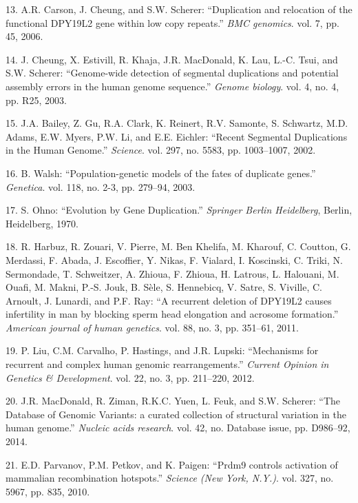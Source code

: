 \documentclass[12pt,twoside]{reedthesis}
\begin{document}
  \hypertarget{ref-Carson2006}{}
  13. A.R. Carson, J. Cheung, and S.W. Scherer: ``Duplication and
  relocation of the functional DPY19L2 gene within low copy repeats.''
  \emph{BMC genomics}. vol. 7, pp. 45, 2006.
  
  \hypertarget{ref-Cheung2003}{}
  14. J. Cheung, X. Estivill, R. Khaja, J.R. MacDonald, K. Lau, L.-C.
  Tsui, and S.W. Scherer: ``Genome-wide detection of segmental
  duplications and potential assembly errors in the human genome
  sequence.'' \emph{Genome biology}. vol. 4, no. 4, pp. R25, 2003.
  
  \hypertarget{ref-Bailey2002}{}
  15. J.A. Bailey, Z. Gu, R.A. Clark, K. Reinert, R.V. Samonte, S.
  Schwartz, M.D. Adams, E.W. Myers, P.W. Li, and E.E. Eichler: ``Recent
  Segmental Duplications in the Human Genome.'' \emph{Science}. vol. 297,
  no. 5583, pp. 1003--1007, 2002.
  
  \hypertarget{ref-Walsh2003}{}
  16. B. Walsh: ``Population-genetic models of the fates of duplicate
  genes.'' \emph{Genetica}. vol. 118, no. 2-3, pp. 279--94, 2003.
  
  \hypertarget{ref-Ohno1970}{}
  17. S. Ohno: ``Evolution by Gene Duplication.'' \emph{Springer Berlin
  Heidelberg}, Berlin, Heidelberg, 1970.
  
  \hypertarget{ref-Harbuz2011a}{}
  18. R. Harbuz, R. Zouari, V. Pierre, M. Ben Khelifa, M. Kharouf, C.
  Coutton, G. Merdassi, F. Abada, J. Escoffier, Y. Nikas, F. Vialard, I.
  Koscinski, C. Triki, N. Sermondade, T. Schweitzer, A. Zhioua, F. Zhioua,
  H. Latrous, L. Halouani, M. Ouafi, M. Makni, P.-S. Jouk, B. Sèle, S.
  Hennebicq, V. Satre, S. Viville, C. Arnoult, J. Lunardi, and P.F. Ray:
  ``A recurrent deletion of DPY19L2 causes infertility in man by blocking
  sperm head elongation and acrosome formation.'' \emph{American journal
  of human genetics}. vol. 88, no. 3, pp. 351--61, 2011.
  
  \hypertarget{ref-Liu2012}{}
  19. P. Liu, C.M. Carvalho, P. Hastings, and J.R. Lupski: ``Mechanisms
  for recurrent and complex human genomic rearrangements.'' \emph{Current
  Opinion in Genetics \& Development}. vol. 22, no. 3, pp. 211--220, 2012.
  
  \hypertarget{ref-MacDonald2014}{}
  20. J.R. MacDonald, R. Ziman, R.K.C. Yuen, L. Feuk, and S.W. Scherer:
  ``The Database of Genomic Variants: a curated collection of structural
  variation in the human genome.'' \emph{Nucleic acids research}. vol. 42,
  no. Database issue, pp. D986--92, 2014.
  
  \hypertarget{ref-Parvanov2010}{}
  21. E.D. Parvanov, P.M. Petkov, and K. Paigen: ``Prdm9 controls
  activation of mammalian recombination hotspots.'' \emph{Science (New
  York, N.Y.)}. vol. 327, no. 5967, pp. 835, 2010.
  
\end{document}
